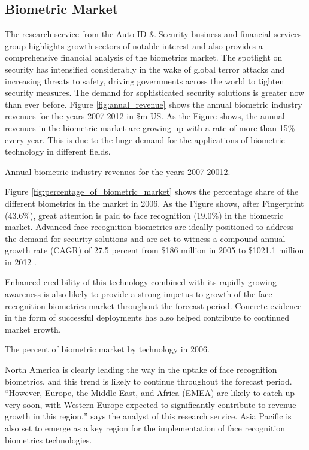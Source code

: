 \subsection{Biometric Market}
The research service from the Auto ID \& Security business and
financial services group highlights growth sectors of notable
interest and also provides a comprehensive financial analysis of the
biometrics market.  The spotlight on security has intensified
considerably in the wake of global terror attacks and increasing
threats to safety, driving governments across the world to tighten
security measures. The demand for sophisticated security solutions
is greater now than ever before. Figure \ref{fig:anual_revenue}
shows the annual biometric industry revenues for the years 2007-2012
in \$m US. As the Figure shows, the annual revenues in the biometric
market are growing up with a rate of more than 15\% every year. This
is due to the huge demand for the applications of biometric
technology in different fields.

\bfig {} \caption{Annual biometric industry revenues for the years
2007-20012.} \label{fig:anual_revenue}\efig

Figure \ref{fig:percentage_of_biometric_market} shows the percentage
share of the different biometrics in the market in 2006. As the
Figure shows, after Fingerprint (43.6\%), great attention is paid to
face recognition (19.0\%) in the biometric market. Advanced face
recognition biometrics are ideally positioned to address the demand
for security solutions and are set to witness a compound annual
growth rate (CAGR) of 27.5 percent from \$186 million in 2005 to
\$1021.1 million in 2012 \cite{frost06}.

Enhanced credibility of this technology combined with its rapidly
growing awareness is also likely to provide a strong impetus to
growth of the face recognition biometrics market throughout the
forecast period. Concrete evidence in the form of successful
deployments has also helped contribute to continued market growth.

\bfig {} \caption{The percent of biometric market by technology in
2006.} \label{fig:percentage_of_biometric_market}\efig

North America is clearly leading the way in the uptake of face
recognition biometrics, and this trend is likely to continue
throughout the forecast period. ``However, Europe, the Middle East,
and Africa (EMEA) are likely to catch up very soon, with Western
Europe expected to significantly contribute to revenue growth in
this region,'' says the analyst of this research service. Asia
Pacific is also set to emerge as a key region for the implementation
of face recognition biometrics technologies.

